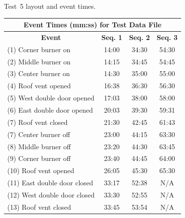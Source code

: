 \documentclass[12pt,oneside]{book}
\begin{document}
\begin{figure}[!ht]
\begin{minipage}[b]{0.9\columnwidth}
\end{minipage}
\caption{Test~5 layout and event times.}
\label{fig:east_test_5}
\end{figure}

\begin{figure}[!ht]
\begin{minipage}[b]{0.8\columnwidth}
	\begin{flushleft}
	\small
	\begin{tabular}{lccc}
	\multicolumn{4}{c}{\normalsize Event Times (mm:ss) for Test Data File} \\
	\toprule
	\multicolumn{1}{c}{\textbf{Event}} & \textbf{Seq. 1} & \textbf{Seq. 2} & \textbf{Seq. 3} \\
	\midrule
	(1) Corner burner on 			& 	14:00		  &	   34:30		&	   54:30	\\
	(2) Middle burner on 			&   14:15		  &	   34:45		&	   54:45	\\
	(3) Center burner on 			&   14:30		  &	   35:00		&	   55:00	\\
	(4) Roof vent opened 			&   16:38		  &    36:30		&	   56:30	\\
	(5) West double door opened 	&	17:03		  &	   38:00 		&	   58:00 	\\
	(6) East double door opened 	&   20:03		  &    39:30		&	   59:31	\\
	(7) Roof vent closed		 	&   21:30		  &    42:45		&	   61:43	\\
	(7) Center burner off 			&   23:00		  &    44:15		&	   63:30	\\
	(8) Middle burner off 			&   23:20		  &    44:30		&	   63:45	\\
	(9) Corner burner off 			&   23:40		  &    44:45		&	   64:00	\\
	(10) Roof vent opened			& 	26:05 		  &	   45:30		&	   65:30	\\
	(11) East double door closed	& 	33:17 		  &	   52:38		&	   N/A		\\
	(12) West double door closed	& 	33:30 		  &	   52:55		&	   N/A		\\
	(13) Roof vent closed		 	&   33:45		  &    53:54		&	   N/A		\\
	\bottomrule
	\end{tabular}
	\end{flushleft}
\end{minipage}
\begin{minipage}[b]{0.9\columnwidth}
	\vspace{15pt}
	\centering

\end{minipage}
\end{figure}
\end{document}
